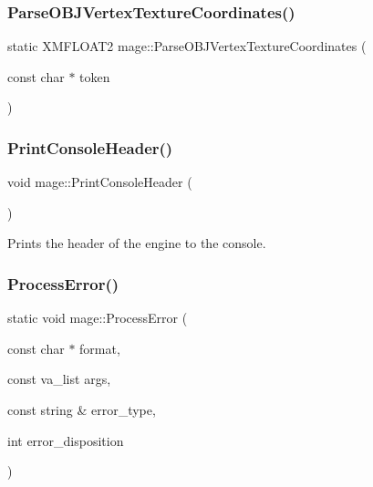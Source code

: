 \hypertarget{namespacemage_a97780c7deeb5a5923b0d6665732e132d}{}\label{namespacemage_a97780c7deeb5a5923b0d6665732e132d} 
\subsubsection{\texorpdfstring{Parse\+O\+B\+J\+Vertex\+Texture\+Coordinates()}{ParseOBJVertexTextureCoordinates()}}
{\footnotesize\ttfamily static X\+M\+F\+L\+O\+A\+T2 mage\+::\+Parse\+O\+B\+J\+Vertex\+Texture\+Coordinates (\begin{DoxyParamCaption}\item[{const char $\ast$}]{token }\end{DoxyParamCaption})\hspace{0.3cm}{\ttfamily [static]}}

\hypertarget{namespacemage_a064756443bd8a1af6974f22c81d29ed0}{}\label{namespacemage_a064756443bd8a1af6974f22c81d29ed0} 
\subsubsection{\texorpdfstring{Print\+Console\+Header()}{PrintConsoleHeader()}}
{\footnotesize\ttfamily void mage\+::\+Print\+Console\+Header (\begin{DoxyParamCaption}{ }\end{DoxyParamCaption})}

Prints the header of the engine to the console. \hypertarget{namespacemage_a12282bdc04d00e024c5ddf93ed9ad785}{}\label{namespacemage_a12282bdc04d00e024c5ddf93ed9ad785} 
\subsubsection{\texorpdfstring{Process\+Error()}{ProcessError()}}
{\footnotesize\ttfamily static void mage\+::\+Process\+Error (\begin{DoxyParamCaption}\item[{const char $\ast$}]{format,  }\item[{const va\+\_\+list}]{args,  }\item[{const string \&}]{error\+\_\+type,  }\item[{int}]{error\+\_\+disposition }\end{DoxyParamCaption})\hspace{0.3cm}{\ttfamily [static]}}

